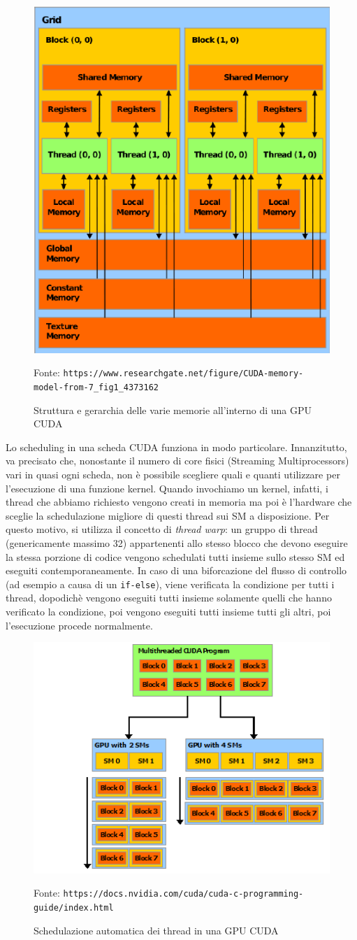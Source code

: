 \documentclass[12pt,a4paper]{book}
\newcommand{\source}[1]{\caption*{Fonte: {\small\texttt{#1}}} }
\begin{document}
	\begin{figure}[!ht]
		\centering
		\includegraphics[width=0.5\linewidth]{CUDA-memory-model}
		\caption[Struttura della memoria di una GPU CUDA]{Struttura e gerarchia delle varie memorie all'interno di una GPU CUDA}
		\source{https://www.researchgate.net/figure/CUDA-memory-model-from-7\_fig1\_4373162}
		\label{fig:cuda-memory-model}
	\end{figure}
	
	Lo scheduling in una scheda CUDA funziona in modo particolare. Innanzitutto, va precisato che, nonostante il numero di core fisici (Streaming Multiprocessors) vari in quasi ogni scheda, non è possibile scegliere quali e quanti utilizzare per l'esecuzione di una funzione kernel. Quando invochiamo un kernel, infatti, i thread che abbiamo richiesto vengono creati in memoria ma poi è l'hardware che sceglie la schedulazione migliore di questi thread sui SM a disposizione. Per questo motivo, si utilizza il concetto di \textit{thread warp}: un gruppo di thread (genericamente massimo 32) appartenenti allo stesso blocco che devono eseguire la stessa porzione di codice vengono schedulati tutti insieme sullo stesso SM ed eseguiti contemporaneamente. In caso di una biforcazione del flusso di controllo (ad esempio a causa di un \texttt{if-else}), viene verificata la condizione per tutti i thread, dopodichè vengono eseguiti tutti insieme solamente quelli che hanno verificato la condizione, poi vengono eseguiti tutti insieme tutti gli altri, poi l'esecuzione procede normalmente.
	
	\begin{figure}[!ht]
		\centering
		\includegraphics[width=0.5\linewidth]{automatic-scalability}
		\caption{Schedulazione automatica dei thread in una GPU CUDA}
		\source{https://docs.nvidia.com/cuda/cuda-c-programming-guide/index.html}
		\label{fig:automatic-scalability}
	\end{figure}
\end{document}
